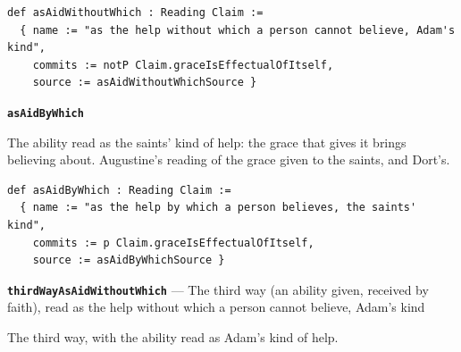\documentclass[11pt]{article}
\begin{document}
{\small\begin{verbatim}
def asAidWithoutWhich : Reading Claim :=
  { name := "as the help without which a person cannot believe, Adam's kind",
    commits := notP Claim.graceIsEffectualOfItself,
    source := asAidWithoutWhichSource }
\end{verbatim}}
\par\medskip\noindent\textbf{\texttt{as\allowbreak{}Aid\allowbreak{}By\allowbreak{}Which}}\par\nobreak\noindent
The ability read as the saints’ kind of help: the grace that gives it brings believing about. Augustine’s reading of the grace given to the saints, and Dort’s.

{\small\begin{verbatim}
def asAidByWhich : Reading Claim :=
  { name := "as the help by which a person believes, the saints' kind",
    commits := p Claim.graceIsEffectualOfItself,
    source := asAidByWhichSource }
\end{verbatim}}
\par\medskip\noindent\textbf{\texttt{third\allowbreak{}Way\allowbreak{}As\allowbreak{}Aid\allowbreak{}Without\allowbreak{}Which}} --- The third way (an ability given, received by faith), read as the help without which a person cannot believe, Adam’s kind\par\nobreak\noindent
The third way, with the ability read as Adam’s kind of help.
\end{document}
